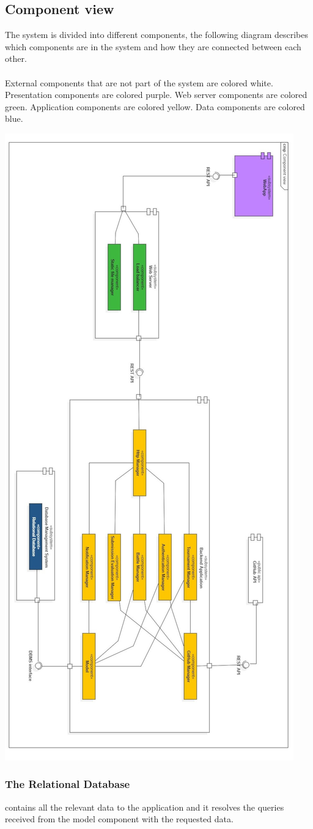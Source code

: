 \documentclass{article}
\begin{document}
\subsection{Component view}
The system is divided into different components, the following diagram describes which components are in the system and how they are connected between each other. 
\\\\
External components that are not part of the system are colored white. Presentation components are colored purple. Web server components are colored green. Application components are colored yellow. Data components are colored blue.
\newpage
\begin{center}
    \includegraphics[width=0.6\linewidth]{cv3.jpg}
  \label{fig:cv}
\end{center}
\subsubsection{The Relational Database}
contains all the relevant data to the application and it resolves the queries received from the model component with the requested data.
\end{document}
